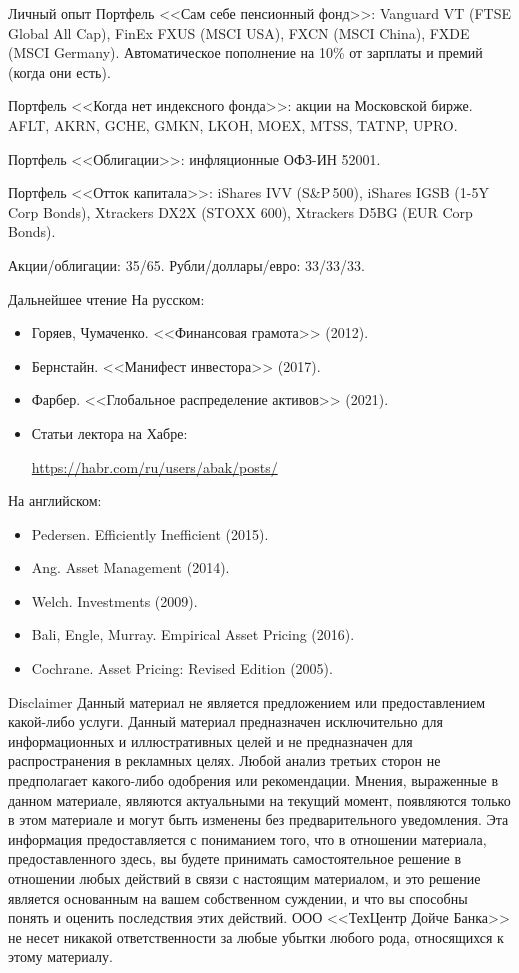 \documentclass{beamer}
\newcommand{\insertdisclaimerframe}{
		\begin{frame}{Disclaimer}
			\small
			\justify
			Данный материал не является предложением или предоставлением
			какой-либо услуги. Данный материал предназначен исключительно для
			информационных и иллюстративных целей и не предназначен для
			распространения в рекламных целях. Любой анализ третьих сторон не 		
			предполагает какого-либо одобрения или рекомендации. Мнения, 
			выраженные в	данном материале, являются актуальными на текущий момент,
			появляются только в этом материале и могут быть изменены без 
			предварительного уведомления. Эта информация предоставляется с 
			пониманием того, что в отношении материала, предоставленного здесь, вы
			будете принимать самостоятельное решение в отношении любых действий в
			связи с настоящим материалом, и это решение является основанным на 
			вашем	собственном суждении, и что вы способны понять и оценить 
			последствия этих действий. ООО <<ТехЦентр Дойче Банка>> не несет 
			никакой ответственности за любые убытки любого рода, относящихся к
			 этому материалу.
		\end{frame}
	}
\newcommand{\insertdisclaimerframe}{
	}
\begin{document}
\begin{frame}{Личный опыт}
\justify
Портфель <<Сам себе пенсионный фонд>>: Vanguard VT (FTSE Global All Cap), FinEx FXUS (MSCI USA), FXCN (MSCI China), FXDE (MSCI Germany). Автоматическое пополнение на 10\% от зарплаты и премий (когда они есть).

\justify
Портфель <<Когда нет индексного фонда>>: акции на Московской бирже. AFLT, AKRN, GCHE, GMKN, LKOH, MOEX, MTSS, TATNP, UPRO.

\justify
Портфель <<Облигации>>: инфляционные ОФЗ-ИН 52001.

\justify
Портфель <<Отток капитала>>: iShares IVV (S\&P\,500), iShares IGSB (1-5Y Corp Bonds), Xtrackers DX2X (STOXX 600), Xtrackers D5BG (EUR Corp Bonds).

\justify
Акции/облигации: 35/65. Рубли/доллары/евро: 33/33/33.
\end{frame}



\begin{frame}{Дальнейшее чтение}
На русском:
\begin{itemize}
\justifying
\item Горяев, Чумаченко. <<Финансовая грамота>> (2012).
\item Бернстайн. <<Манифест инвестора>> (2017).
\item Фарбер. <<Глобальное распределение активов>> (2021).
\item Статьи лектора на Хабре:

\url{https://habr.com/ru/users/abak/posts/}
\end{itemize}
На английском:
\begin{itemize}
\item Pedersen. Efficiently Inefficient (2015).
\item Ang. Asset Management (2014).
\item Welch. Investments (2009).
\item Bali, Engle, Murray. Empirical Asset Pricing (2016).
\item Cochrane. Asset Pricing: Revised Edition (2005).

\end{itemize}
\end{frame}


\insertdisclaimerframe
\end{document}
